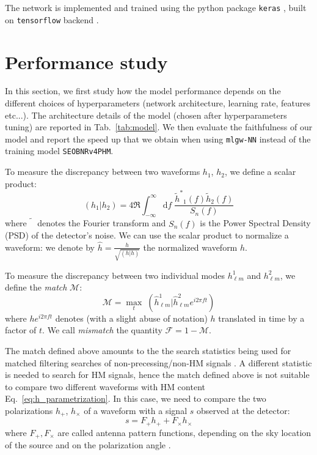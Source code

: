 \documentclass[twocolumn,showpacs,preprintnumbers,nofootinbib,prd,
superscriptaddress,10pt]{revtex4-1}
\newcommand{\rescalar}[2]{( #1 |#2 )}
\begin{document}
The network is implemented and trained using the python package \texttt{keras} \cite{chollet2015keras}, built on \texttt{tensorflow} backend \cite{tensorflow2015-whitepaper}.

\section{Performance study}
\label{sec:performance}
In this section, we first study how the model performance depends on the different choices of hyperparameters (network architecture, learning rate, features etc...).
The architecture details of the model (chosen after hyperparameters tuning) are reported in Tab.~\ref{tab:model}.
We then evaluate the faithfulness of our model and report the speed up that we obtain when using \texttt{mlgw-NN} instead of the training model \texttt{SEOBNRv4PHM}.

To measure the discrepancy between two waveforms  $h_1$, $h_2$, we define a scalar product:
\begin{equation}
	\rescalar{h_1}{h_2} = 4 \Re \int_{-\infty}^{\infty} \text{d}f \; \frac{{\tilde{h}^*}_1(f) \tilde{h}_2(f)}{S_n(f)}
\end{equation}
where $\tilde{\phantom{h}}$ denotes the Fourier transform and $S_n(f)$ is the Power Spectral Density (PSD) of the detector's noise.
We can use the scalar product to normalize a waveform: we denote by $\hat{h} = \frac{h}{\sqrt{\rescalar{h}{h}}}$ the normalized waveform $h$.

To measure the discrepancy between two individual modes $h^1_{\ell m}$ and $h^2_{\ell m}$, we define the {\it match} $\mathcal{M}$:
\begin{equation}\label{eq:match}
	\mathcal{M} = \max_t \; \rescalar{\hat{h}^1_{\ell m}}{\hat{h}^2_{\ell m} e^{i 2\pi ft}}
\end{equation}
where $h e^{i 2\pi ft}$ denotes (with a slight abuse of notation) $h$ translated in time by a factor of $t$.
We call {\it mismatch} the quantity $\mathcal{F} = 1 - \mathcal{M}$.

The match defined above amounts to the the search statistics being used for matched filtering searches of non-precessing/non-HM signals \cite{}.
A different statistic is needed to search for HM signals, hence the match defined above is not suitable to compare two different waveforms with HM content Eq.~\eqref{eq:h_parametrization}.
In this case, we need to compare the two polarizations $h_+$, $h_\times$ of a waveform with a signal $s$ observed at the detector:
\begin{equation}
	s = F_+ h_+ + F_\times h_\times
\end{equation}
where $F_+, F_\times$ are called antenna pattern functions, depending on the sky location of the source and on the polarization angle \cite{}.
\end{document}
